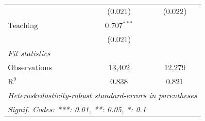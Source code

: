\begin{tabular}{lcc}
                           & (0.021)        & (0.022)\\   
   Teaching                & 0.707$^{***}$  &   \\   
                           & (0.021)        &   \\   
   \midrule
   \emph{Fit statistics}\\
   Observations            & 13,402         & 12,279\\  
   R$^2$                   & 0.838          & 0.821\\  
   \midrule \midrule
   \multicolumn{3}{l}{\emph{Heteroskedasticity-robust standard-errors in parentheses}}\\
   \multicolumn{3}{l}{\emph{Signif. Codes: ***: 0.01, **: 0.05, *: 0.1}}\\
\end{tabular}
\par\endgroup


